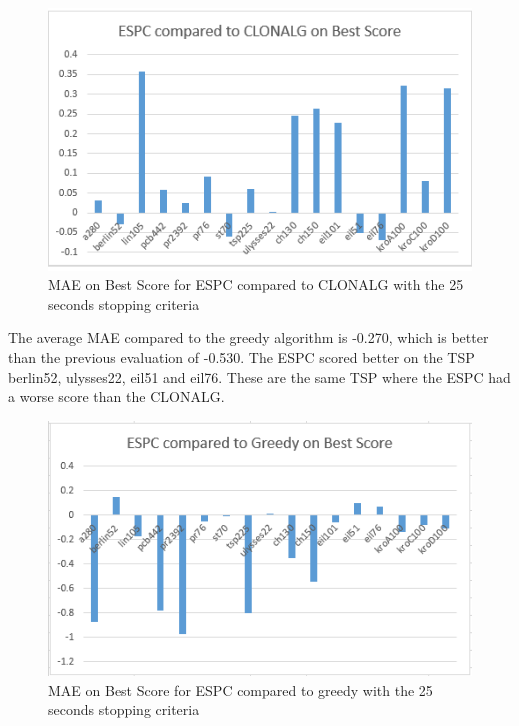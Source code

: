 \begin{figure}[H]
	\includegraphics[]{Images/ESPC_Time.png}
	\caption{MAE on Best Score for ESPC compared to CLONALG with the 25 seconds stopping criteria}
	\label{ESPC_Time}
\end{figure}
The average MAE compared to the greedy algorithm is -0.270, which is better than the previous evaluation of -0.530. The ESPC scored better on the TSP berlin52, ulysses22, eil51 and eil76. These are the same TSP where the ESPC had a worse score than the CLONALG.
\begin{figure}[H]
	\includegraphics[]{Images/ESPC_greedy_Time.png}
	\caption{MAE on Best Score for ESPC compared to greedy with the 25 seconds stopping criteria}
	\label{ESPC_greedy_TIME}
\end{figure}
\newpage
